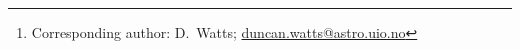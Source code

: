 \newcommand{\oslo}[0]{1}
\newcommand{\iiabangalore}[0]{2}

\author{\small
D.~J.~Watts\thanks{Corresponding author: D.~Watts; \url{duncan.watts@astro.uio.no}}
\and
M.~Galloway
\and
E.~Gjerl\o w
\and
M.~San
\and
R.~Aurlien
\and
A.~Basyrov
\and
M.~Brilenkov
\and
H.~K.~Eriksen
\and
U.~Fuskeland
\and
D.~Herman
\and
H.~T.~Ihle
\and
J.~G.~S.~Lunde
\and
S.~K.~Næss
\and
N.-O.~Stutzer
\and
H.~Thommesen
\and
I.~K.~Wehus
}
